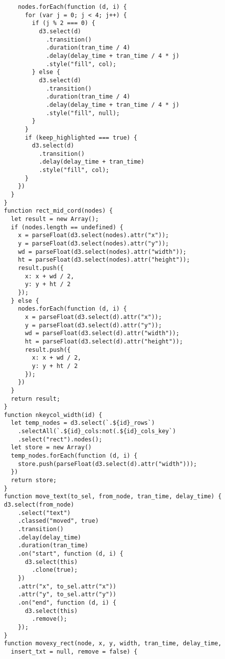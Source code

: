 \begin{lstlisting}
    nodes.forEach(function (d, i) {
      for (var j = 0; j < 4; j++) {
        if (j % 2 === 0) {
          d3.select(d)
            .transition()
            .duration(tran_time / 4)
            .delay(delay_time + tran_time / 4 * j)
            .style("fill", col);
        } else {
          d3.select(d)
            .transition()
            .duration(tran_time / 4)
            .delay(delay_time + tran_time / 4 * j)
            .style("fill", null);
        }
      }
      if (keep_highlighted === true) {
        d3.select(d)
          .transition()
          .delay(delay_time + tran_time)
          .style("fill", col);
      }
    })
  }
}
function rect_mid_cord(nodes) {
  let result = new Array();
  if (nodes.length == undefined) {
    x = parseFloat(d3.select(nodes).attr("x"));
    y = parseFloat(d3.select(nodes).attr("y"));
    wd = parseFloat(d3.select(nodes).attr("width"));
    ht = parseFloat(d3.select(nodes).attr("height"));
    result.push({
      x: x + wd / 2,
      y: y + ht / 2
    });
  } else {
    nodes.forEach(function (d, i) {
      x = parseFloat(d3.select(d).attr("x"));
      y = parseFloat(d3.select(d).attr("y"));
      wd = parseFloat(d3.select(d).attr("width"));
      ht = parseFloat(d3.select(d).attr("height"));
      result.push({
        x: x + wd / 2,
        y: y + ht / 2
      });
    })
  }
  return result;
}
function nkeycol_width(id) {
  let temp_nodes = d3.select(`.${id}_rows`)
    .selectAll(`.${id}_cols:not(.${id}_cols_key`)
    .select("rect").nodes();
  let store = new Array()
  temp_nodes.forEach(function (d, i) {
    store.push(parseFloat(d3.select(d).attr("width")));
  })
  return store;
}
function move_text(to_sel, from_node, tran_time, delay_time) {
d3.select(from_node)
    .select("text")
    .classed("moved", true)
    .transition()
    .delay(delay_time)
    .duration(tran_time)
    .on("start", function (d, i) {
      d3.select(this)
        .clone(true);
    })
    .attr("x", to_sel.attr("x"))
    .attr("y", to_sel.attr("y"))
    .on("end", function (d, i) {
      d3.select(this)
        .remove();
    });
}
function movexy_rect(node, x, y, width, tran_time, delay_time,
  insert_txt = null, remove = false) {


\end{lstlisting}

